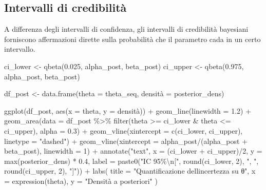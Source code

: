 \documentclass[
  italian,
  letterpaper,
  a4paper,
  11pt,
  open=any]{scrbook}
\newenvironment{Shaded}{\begin{snugshade}}{\end{snugshade}}
\newcommand{\AttributeTok}[1]{\textcolor[rgb]{0.40,0.45,0.13}{#1}}
\newcommand{\DecValTok}[1]{\textcolor[rgb]{0.68,0.00,0.00}{#1}}
\newcommand{\FloatTok}[1]{\textcolor[rgb]{0.68,0.00,0.00}{#1}}
\newcommand{\FunctionTok}[1]{\textcolor[rgb]{0.28,0.35,0.67}{#1}}
\newcommand{\NormalTok}[1]{\textcolor[rgb]{0.00,0.23,0.31}{#1}}
\newcommand{\OtherTok}[1]{\textcolor[rgb]{0.00,0.23,0.31}{#1}}
\newcommand{\SpecialCharTok}[1]{\textcolor[rgb]{0.37,0.37,0.37}{#1}}
\newcommand{\StringTok}[1]{\textcolor[rgb]{0.13,0.47,0.30}{#1}}
\theoremstyle{plain}
\theoremstyle{definition}
\theoremstyle{definition}
\theoremstyle{remark}
\begin{document}
\subsection{Intervalli di
credibilità}\label{intervalli-di-credibilituxe0}

A differenza degli intervalli di confidenza, gli intervalli di
credibilità bayesiani forniscono affermazioni dirette sulla probabilità
che il parametro cada in un certo intervallo.

\begin{Shaded}
\begin{Highlighting}[]
\NormalTok{ci\_lower }\OtherTok{\textless{}{-}} \FunctionTok{qbeta}\NormalTok{(}\FloatTok{0.025}\NormalTok{, alpha\_post, beta\_post)}
\NormalTok{ci\_upper }\OtherTok{\textless{}{-}} \FunctionTok{qbeta}\NormalTok{(}\FloatTok{0.975}\NormalTok{, alpha\_post, beta\_post)}

\NormalTok{df\_post }\OtherTok{\textless{}{-}} \FunctionTok{data.frame}\NormalTok{(}\AttributeTok{theta =}\NormalTok{ theta\_seq, densità }\OtherTok{=}\NormalTok{ posterior\_dens)}

\FunctionTok{ggplot}\NormalTok{(df\_post, }\FunctionTok{aes}\NormalTok{(}\AttributeTok{x =}\NormalTok{ theta, }\AttributeTok{y =}\NormalTok{ densità)) }\SpecialCharTok{+}
  \FunctionTok{geom\_line}\NormalTok{(}\AttributeTok{linewidth =} \FloatTok{1.2}\NormalTok{) }\SpecialCharTok{+}
  \FunctionTok{geom\_area}\NormalTok{(}\AttributeTok{data =}\NormalTok{ df\_post }\SpecialCharTok{\%\textgreater{}\%} \FunctionTok{filter}\NormalTok{(theta }\SpecialCharTok{\textgreater{}=}\NormalTok{ ci\_lower }\SpecialCharTok{\&}\NormalTok{ theta }\SpecialCharTok{\textless{}=}\NormalTok{ ci\_upper),}
            \AttributeTok{alpha =} \FloatTok{0.3}\NormalTok{) }\SpecialCharTok{+}
  \FunctionTok{geom\_vline}\NormalTok{(}\AttributeTok{xintercept =} \FunctionTok{c}\NormalTok{(ci\_lower, ci\_upper), }\AttributeTok{linetype =} \StringTok{"dashed"}\NormalTok{) }\SpecialCharTok{+}
  \FunctionTok{geom\_vline}\NormalTok{(}\AttributeTok{xintercept =}\NormalTok{ alpha\_post}\SpecialCharTok{/}\NormalTok{(alpha\_post }\SpecialCharTok{+}\NormalTok{ beta\_post), }\AttributeTok{linewidth =} \DecValTok{1}\NormalTok{) }\SpecialCharTok{+}
  \FunctionTok{annotate}\NormalTok{(}\StringTok{"text"}\NormalTok{, }\AttributeTok{x =}\NormalTok{ (ci\_lower }\SpecialCharTok{+}\NormalTok{ ci\_upper)}\SpecialCharTok{/}\DecValTok{2}\NormalTok{, }\AttributeTok{y =} \FunctionTok{max}\NormalTok{(posterior\_dens) }\SpecialCharTok{*} \FloatTok{0.4}\NormalTok{,}
           \AttributeTok{label =} \FunctionTok{paste0}\NormalTok{(}\StringTok{"IC 95\%}\SpecialCharTok{\textbackslash{}n}\StringTok{["}\NormalTok{, }\FunctionTok{round}\NormalTok{(ci\_lower, }\DecValTok{2}\NormalTok{), }\StringTok{", "}\NormalTok{, }\FunctionTok{round}\NormalTok{(ci\_upper, }\DecValTok{2}\NormalTok{), }\StringTok{"]"}\NormalTok{)) }\SpecialCharTok{+}
  \FunctionTok{labs}\NormalTok{(}
    \AttributeTok{title =} \StringTok{"Quantificazione dell\textquotesingle{}incertezza su θ"}\NormalTok{,}
    \AttributeTok{x =} \FunctionTok{expression}\NormalTok{(theta),}
    \AttributeTok{y =} \StringTok{"Densità a posteriori"}
\NormalTok{  )}
\end{Highlighting}
\end{Shaded}
\end{document}
